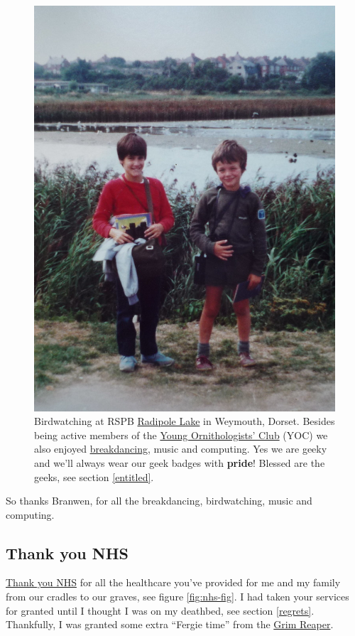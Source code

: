 \documentclass[
]{book}
\begin{document}
\begin{figure}

{\centering \includegraphics[width=0.5\linewidth]{images/radipole-lake} 

}

\caption{Birdwatching at RSPB \href{https://en.wikipedia.org/wiki/Radipole_Lake}{Radipole Lake} in Weymouth, Dorset. Besides being active members of the \href{https://en.wikipedia.org/wiki/Young_Ornithologists\%27_Club}{Young Ornithologists' Club} (YOC) we also enjoyed \href{https://en.wikipedia.org/wiki/Breakdancing}{breakdancing}, music and computing. Yes we are geeky and we'll always wear our geek badges with \textbf{pride}! Blessed are the geeks, see section \ref{entitled}.}\label{fig:branwen-fig}
\end{figure}



So thanks Branwen, for all the breakdancing, birdwatching, music and computing.

\hypertarget{thxnhs}{%
\subsection{Thank you NHS}\label{thxnhs}}

\href{https://en.wikipedia.org/wiki/Thank_You_NHS}{Thank you NHS} for all the healthcare you've provided for me and my family from our cradles to our graves, see figure \ref{fig:nhs-fig}. I had taken your services for granted until I thought I was on my deathbed, see section \ref{regrets}. Thankfully, I was granted some extra ``Fergie time'' from the \href{https://en.wikipedia.org/wiki/Death_(personification)}{Grim Reaper}. \citep{fergietime}
\end{document}
